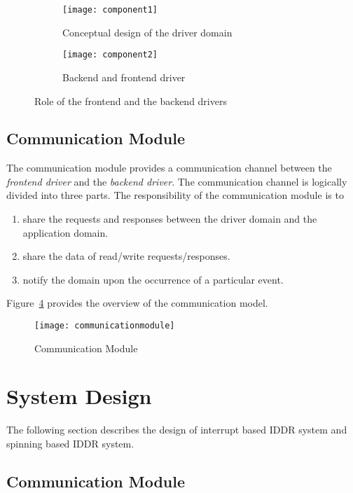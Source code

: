 \begin{figure}[!ht]
    \centering
    \begin{subfigure}[b]{0.45\textwidth}
	\texttt{[image: component1]}
	\caption{Conceptual design of the driver domain}
	\label{fig:conept}
    \end{subfigure}
	\hfill
    \begin{subfigure}[b]{0.45\textwidth}
	\texttt{[image: component2]}
	\caption{Backend and frontend driver}
	\label{fig:backendfrontend}
    \end{subfigure}
    \caption{Role of the frontend and the backend drivers}\label{fig:fault tolerence}
\end{figure}

\subsection{Communication Module}
\label{sub:communicationmodule}
The communication module provides a communication channel between the \textit{frontend driver} and the \textit{backend driver}. The communication channel is logically divided into three parts. The responsibility of the communication module is to
\begin{enumerate} 
\item share the requests and responses between the driver domain and the application domain.
\item share the data of read/write requests/responses.
\item notify the domain upon the occurrence of a particular event. 
\end{enumerate}

Figure~\ref{fig:communication} provides the overview of the communication model. 
\begin{figure}[!ht]
\centering
\texttt{[image: communicationmodule]}
\caption{Communication Module}
\label{fig:communication}
\end{figure}

\section{System Design}\label{design}

The following section describes the design of interrupt based IDDR system and spinning based IDDR system. 

\subsection{Communication Module}


